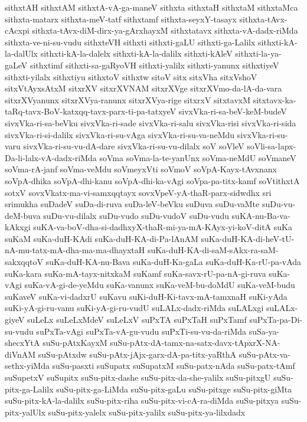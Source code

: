 {sithxtAH
sithxtAM
sithxtA-vA-ga-maneV
sithxta
sithxtaH
sithxtaM
sithxtaMca
sithxta-matarx
sithxta-meV-tatf
sithxtamf
sithxta-seyxY-tasayx
sithxta-tAvx-cAcxpi
sithxta-tAvx-diM-dirx-ya-gArxhayxM
sithxtatavx
sithxta-vA-dadx-riMda
sithxta-ve-ni-su-vudu
sithxteVH
sithxti
sithxti-gaLU
sithxti-ga-Lalilx
sithxti-kA-la-dalUlx
sithxti-kA-la-dalelx
sithxti-kA-la-dalilx
sithxti-kAleV
sithxti-la-ya-gaLeV
sithxtimf
sithxti-sa-gaRyoVH
sithxti-yalilx
sithxti-yanunx
sithxtiyeV
sithxti-yilalx
sithxtiyu
sithxtoV
sithxtw
sitoV
sitx
sitxVha
sitxVshoV
sitxVtAyxsAtxM
sitxrXV
sitxrXVNAM
sitxrXVge
sitxrXVmo-da-lA-da-vara
sitxrXVyanunx
sitxrXVya-ranunx
sitxrXVya-rige
sitxrxV
sitxtavxM
sitxtavx-ka-taRq-tavx-BoV-katxqq-tavx-parx-ti-pa-tatxyeV
sivxVka-ri-sa-beV-keM-budeV
sivxVka-ri-sa-beVku
sivxVka-ri-sade
sivxVka-ri-salu
sivxVka-risi
sivxVka-ri-sida
sivxVka-ri-si-dalilx
sivxVka-ri-su-vAga
sivxVka-ri-su-va-neMdu
sivxVka-ri-su-varu
sivxVka-ri-su-vu-dA-dare
sivxVka-ri-su-vu-dilalx
soV
soVleV
soVli-sa-lapx-Da-li-lalx-vA-dadx-riMda
soVma
soVma-la-te-yanUnx
soVma-neMdU
soVmaneV
soVma-rA-janf
soVma-veMdu
soVmeyxVti
soVmoV
soVpA-Kayx-tAvxnanx
soVpA-dhika
soVpA-dhi-kanu
soVpA-dhi-ka-vAgi
soVpa-pa-titx-kamf
soVtithxtA
sotxV
sovxVkatx-ma-vi-samxqqtayx
sovxVpeV-yA-thaR-parx-sidwdhx
sri
srimukha
suDadeV
suDa-di-ruva
suDa-leV-beVku
suDuva
suDu-vaMte
suDu-vu-deM-buva
suDu-vu-dilalx
suDu-vudo
suDu-vudoV
suDu-vudu
suKA-nu-Ba-va-kAkxgi
suKA-va-boV-dha-si-dadhxyX-thaR-mi-ya-mA-KAyx-yi-koV-ditA
suKa
suKaM
suKa-duH-KAdi
suKa-duH-KA-di-Pa-lAnAM
suKa-duH-KA-di-heV-tU-nA-mu-tatx-mA-dha-ma-ma-dhayxtaH
suKa-duH-KA-di-saM-sAkx-ra-saM-sakxqqtoV
suKa-duH-KA-nu-Bava
suKa-duH-Ka-gaLa
suKa-duH-Ka-rU-pa-vAda
suKa-kara
suKa-mA-tayx-nitxkaM
suKamf
suKa-savx-rU-pa-nA-gi-ruva
suKa-vAgi
suKa-vA-gi-de-yeMdu
suKa-vanunx
suKa-veM-bu-doMdU
suKa-veM-budu
suKaveV
suKa-vi-dadxrU
suKavu
suKi-duH-Ki-tavx-mA-tamxnaH
suKi-yAda
suKi-yA-gi-ru-vanu
suKi-yA-gi-ru-vudU
suLALx-dadx-riMda
suLALxgi
suLALx-giyeV
suLeLx
suLeLxMdeV
suLeLxV
suPxTA
suPxTaH
suPxTamf
suPxTa-pa-Di-su-vudu
suPxTa-vAgi
suPxTa-vA-gu-vudu
suPxTi-su-vu-da-riMda
suSa-ya-shecxYtA
suSu-pAtxKayxM
suSu-pAtx-dA-tamx-na-satx-davx-tApxrX-NA-diVnAM
suSu-pAtxdw
suSu-pAtx-jAjx-garx-dA-pa-titx-yaRthA
suSu-pAtx-va-sethx-yiMda
suSu-pasxti
suSupatx
suSupatxM
suSu-patx-nAda
suSu-patx-tAmf
suSupetxV
suSupitx
suSu-pitx-dashe
suSu-pitx-da-she-yalilx
suSu-pitxgU
suSu-pitx-ga-Lalilx
suSu-pitx-ga-LiMda
suSu-pitx-gaLu
suSu-pitxge
suSu-pitx-giMta
suSu-pitx-kA-la-dalilx
suSu-pitx-riha
suSu-pitx-vi-cA-ra-diMda
suSu-pitxya
suSu-pitx-yalUlx
suSu-pitx-yalelx
suSu-pitx-yalilx
suSu-pitx-ya-lilxdadx
}
